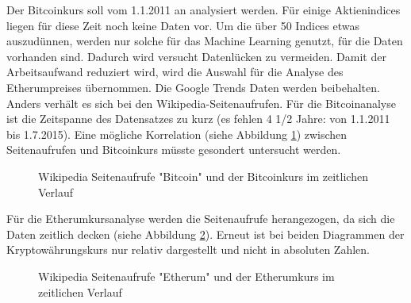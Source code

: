 Der Bitcoinkurs soll vom 1.1.2011 an analysiert werden. Für einige Aktienindices liegen für diese Zeit noch keine Daten vor. Um die über 50 Indices etwas auszudünnen, werden nur solche für das Machine Learning genutzt, für die Daten vorhanden sind. Dadurch wird versucht Datenlücken zu vermeiden. Damit der Arbeitsaufwand reduziert wird, wird die Auswahl für die Analyse des Etherumpreises übernommen. Die Google Trends Daten werden beibehalten. Anders verhält es sich bei den Wikipedia-Seitenaufrufen. Für die Bitcoinanalyse ist die Zeitspanne des Datensatzes zu kurz (es fehlen 4 1/2 Jahre: von 1.1.2011 bis 1.7.2015). Eine mögliche Korrelation (siehe Abbildung \ref{fig:WikiBTC}) zwischen Seitenaufrufen und Bitcoinkurs müsste gesondert untersucht werden. 
\begin{figure}[H]
\caption{Wikipedia Seitenaufrufe "Bitcoin" und der Bitcoinkurs im zeitlichen Verlauf}
\label{fig:WikiBTC}
\centering
\end{figure}
Für die Etherumkursanalyse werden die Seitenaufrufe herangezogen, da sich die Daten zeitlich decken (siehe Abbildung \ref{fig:WikiETH}). Erneut ist bei beiden Diagrammen der Kryptowährungskurs nur relativ dargestellt und nicht in absoluten Zahlen. 
\begin{figure}[H]
\caption{Wikipedia Seitenaufrufe "Etherum" und der Etherumkurs im zeitlichen Verlauf}
\label{fig:WikiETH}
\centering
\end{figure}


